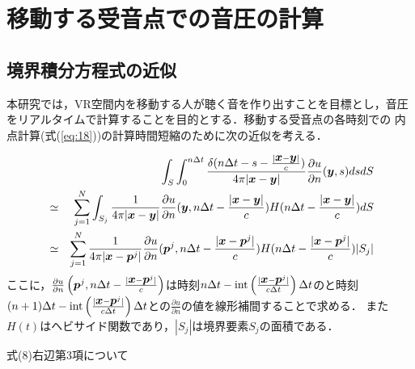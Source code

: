 \documentclass[dvipdfmx]{ampbt}
\def\vector#1{\mbox{\boldmath $#1$}}
\begin{document}
\section{移動する受音点での音圧の計算}
\label{３章}
\subsection{境界積分方程式の近似}
\label{kinji}
本研究では，VR空間内を移動する人が聴く音を作り出すことを目標とし，音圧をリアルタイムで計算することを目的とする．移動する受音点の各時刻での
内点計算(式(\ref{eq:18}))の計算時間短縮のために次の近似を考える．






\begin{eqnarray}
&&\int_S\int_0^{n\Delta t}\frac{\delta (n\Delta t-s-\frac{|\vector{x}-\vector{y}|}{c})}{4\pi |\vector{x}-\vector{y}|} \frac{\partial u}{\partial n}(\vector{y},s)dsdS  \nonumber \\
&\simeq&\sum_{j=1}^N \int_{S_j} \frac{1}{4\pi |\vector{x}-\vector{y}|} \frac{\partial u}{\partial n}(\vector{y},n\Delta t-\frac{|\vector{x}-\vector{y}|}{c}) H(n\Delta t-\frac{|\vector{x}-\vector{y}|}{c})dS \nonumber \\
&\simeq& \sum_{j=1}^N \frac{1}{4\pi |\vector{x}-\vector{p}^j|}  \frac{\partial u}{\partial n}(\vector{p}^j,n\Delta t-\frac{|\vector{x}-\vector{p}^j|}{c})H(n\Delta t-\frac{|\vector{x}-\vector{p}^j|}{c})|S_j|
\end{eqnarray}
ここに，$\frac{\partial u}{\partial n}\left(\vector{p}^j,n\Delta t-\frac{|\vector{x}-\vector{p}^j|}{c} \right)$は時刻$n\Delta t-\mathrm{int}\left( \frac{|\vector{x}-\vector{p}^j|}{c\Delta t} \right)\Delta t$のと時刻
$(n+1)\Delta t-\mathrm{int}\left( \frac{|\vector{x}-\vector{p}^j|}{c\Delta t}\right)\Delta t$との$\frac{\partial u}{\partial n}$の値を線形補間することで求める．
また$H(t)$はヘビサイド関数であり，$|S_j|$は境界要素$S_j$の面積である．

式(8)右辺第3項について
\end{document}
